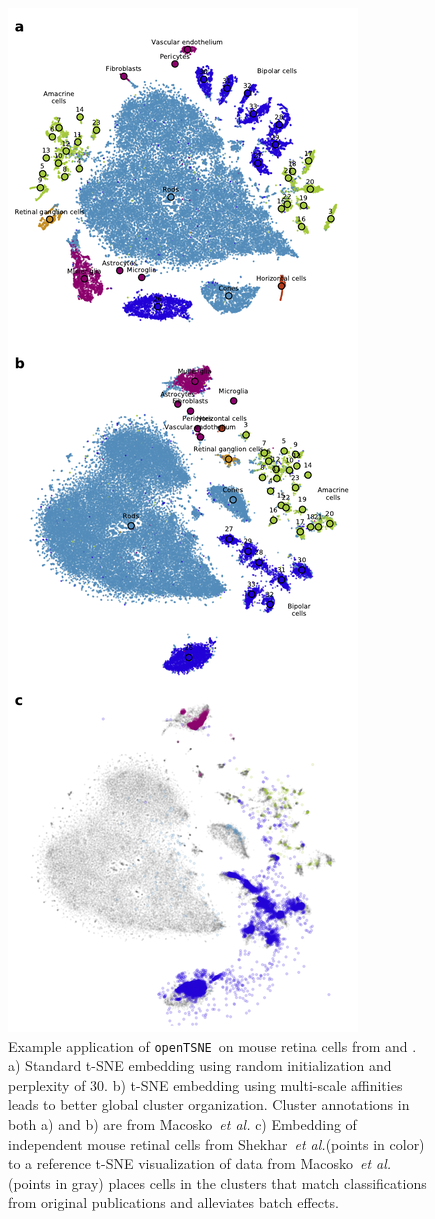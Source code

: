 \documentclass{bioinfo}
\def\etal{{\em et al.}\xspace}
\newcommand{\opentsne}[0]{{\tt openTSNE}\ }
\begin{document}
\begin{figure}[htbp]
\centerline{\includegraphics[width=0.7\linewidth]{policar-fig-1}}
\vspace{-3mm}
\caption{Example application of \opentsne on mouse retina cells from
\citet{Macosko2015} and \citet{Shekhar2016}. a) Standard t-SNE embedding using
random initialization and perplexity of 30. b) t-SNE embedding using
multi-scale affinities leads to better global cluster organization. Cluster
annotations in both a) and b) are from Macosko~\etal c) Embedding of independent mouse retinal cells from
Shekhar~\etal (points in color) to a reference t-SNE visualization of data from
Macosko~\etal (points in gray) places cells in the clusters that match
classifications from original publications and alleviates batch effects.}
\label{fig:tsne}
\end{figure}
\end{document}
